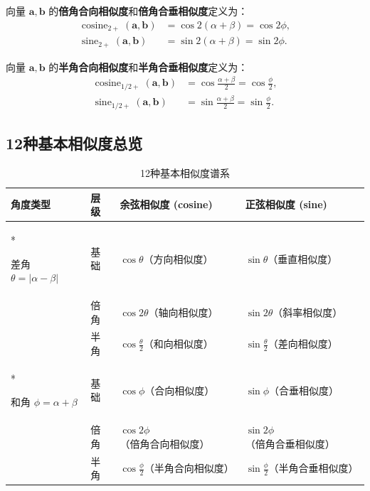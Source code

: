 \begin{definition}[倍角和角相似度]\label{def:double_sum_similarity}
向量 $\mathbf{a}, \mathbf{b}$ 的\textbf{倍角合向相似度}和\textbf{倍角合垂相似度}定义为：
\begin{align*}
\operatorname{cosine}_{2+}(\mathbf{a}, \mathbf{b}) &= \cos 2(\alpha + \beta) = \cos 2\phi, \\
\operatorname{sine}_{2+}(\mathbf{a}, \mathbf{b}) &= \sin 2(\alpha + \beta) = \sin 2\phi.
\end{align*}
\end{definition}

\begin{definition}[半角和角相似度]\label{def:half_sum_similarity}
向量 $\mathbf{a}, \mathbf{b}$ 的\textbf{半角合向相似度}和\textbf{半角合垂相似度}定义为：
\begin{align*}
\operatorname{cosine}_{1/2+}(\mathbf{a}, \mathbf{b}) &= \cos\frac{\alpha + \beta}{2} = \cos\frac{\phi}{2}, \\
\operatorname{sine}_{1/2+}(\mathbf{a}, \mathbf{b}) &= \sin\frac{\alpha + \beta}{2} = \sin\frac{\phi}{2}.
\end{align*}
\end{definition}
\subsection{\texorpdfstring{12种基本相似度总览}{12种基本相似度总览}}

\begin{table}[htbp]
    \centering
    \caption{12种基本相似度谱系}
    \label{tab:similarity_spectrum}
    \begin{tabular}{>{\centering\arraybackslash}p{2.2cm}>{\centering\arraybackslash}p{2cm}>{\centering\arraybackslash}p{3.5cm}>{\centering\arraybackslash}p{3.5cm}}
        \toprule
        角度类型 & 层级 & 余弦相似度 (cosine) & 正弦相似度 (sine) \\
        \midrule
        \multirow{3}*{\parbox{2.0cm}{\centering 差角 $\theta=\lvert\alpha-\beta\rvert$}}
        & 基础 & $\cos\theta$（方向相似度） & $\sin\theta$（垂直相似度） \\
        & 倍角 & $\cos 2\theta$（轴向相似度） & $\sin 2\theta$（斜率相似度） \\
        & 半角 & $\cos\frac{\theta}{2}$（和向相似度） & $\sin\frac{\theta}{2}$（差向相似度） \\
        \midrule
        \multirow{3}*{\parbox{2.0cm}{\centering 和角 $\phi=\alpha+\beta$}}
        & 基础 & $\cos\phi$（合向相似度） & $\sin\phi$（合垂相似度） \\
        & 倍角 & $\cos 2\phi$（倍角合向相似度） & $\sin 2\phi$（倍角合垂相似度） \\
        & 半角 & $\cos\frac{\phi}{2}$（半角合向相似度） & $\sin\frac{\phi}{2}$（半角合垂相似度） \\
        \bottomrule
    \end{tabular}
\end{table}

